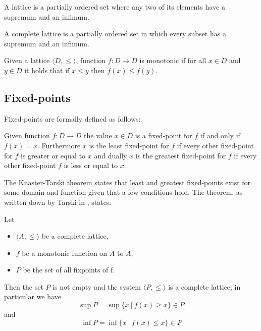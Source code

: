 \begin{definition}
	A lattice is a partially ordered set where any two of its elements have a supremum and an infimum.
\end{definition}

\begin{definition}
	A complete lattice is a partially ordered set in which every subset has a supremum and an infimum.
\end{definition}

\begin{definition}
	Given a lattice $\langle D, \leq \rangle$, function $f : D \rightarrow D$ is monotonic if for all $x \in D$ and $y \in D$ it holds that if $x \leq y$ then $f(x) \leq f(y)$.
\end{definition}
\subsection{Fixed-points}
Fixed-points are formally defined as follows:
\begin{definition}
	Given function $f : D \rightarrow D$ the value $x \in D$ is a fixed-point for $f$ if and only if $f(x) = x$. Furthermore $x$ is the least fixed-point for $f$ if every other fixed-point for $f$ is greater or equal to $x$ and dually $x$ is the greatest fixed-point for $f$ if every other fixed-point $f$ is less or equal to $x$.
\end{definition}
The Knaster-Tarski theorem states that least and greatest fixed-points exist for some domain and function given that a few conditions hold.
The theorem, as written down by Tarski in \cite{tarski1955}, states:
\begin{theorem}
	\label{the_knaster_tarski}
	Let
	\begin{itemize}
		\item $\langle A, \leq \rangle$ be a complete lattice,
		\item $f$ be a monotonic function on $A$ to $A$,
		\item $P$ be the set of all fixpoints of f.
	\end{itemize}
	Then the set $P$ is not empty and the system $\langle P, \leq \rangle$ is a complete lattice; in particular we have 
	\[ \sup P = \sup \{ x\ |\ f(x) \geq x \} \in P \]
	and
	\[ \inf P = \inf \{ x\ |\ f(x) \leq x \} \in P \]
\end{theorem}

